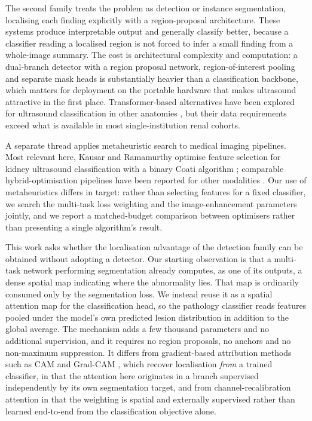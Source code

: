 \documentclass[pdflatex,sn-mathphys-num]{sn-jnl}
\theoremstyle{thmstyleone}%
\theoremstyle{thmstyletwo}%
\theoremstyle{thmstylethree}%
\begin{document}
The second family treats the problem as detection or instance segmentation, localising each
finding explicitly with a region-proposal architecture. These systems produce interpretable
output and generally classify better, because a classifier reading a localised region is not
forced to infer a small finding from a whole-image summary. The cost is architectural complexity
and computation: a dual-branch detector with a region proposal network, region-of-interest
pooling and separate mask heads is substantially heavier than a classification backbone, which
matters for deployment on the portable hardware that makes ultrasound attractive in the first
place. Transformer-based alternatives have been explored for ultrasound classification in other
anatomies \cite{bib_fetalvit}, but their data requirements exceed what is available in most
single-institution renal cohorts.

A separate thread applies metaheuristic search to medical imaging pipelines. Most relevant here,
Kausar and Ramamurthy optimise feature selection for kidney ultrasound classification with a
binary Coati algorithm \cite{bib_coatikidney}; comparable hybrid-optimisation pipelines have been
reported for other modalities \cite{bib_dentalopt}. Our use of metaheuristics differs in target:
rather than selecting features for a fixed classifier, we search the multi-task loss weighting
and the image-enhancement parameters jointly, and we report a matched-budget comparison between
optimisers rather than presenting a single algorithm's result.

This work asks whether the localisation advantage of the detection family can be obtained
without adopting a detector. Our starting observation is that a multi-task network performing
segmentation already computes, as one of its outputs, a dense spatial map indicating where the
abnormality lies. That map is ordinarily consumed only by the segmentation loss. We instead reuse
it as a spatial attention map for the classification head, so the pathology classifier reads
features pooled under the model's own predicted lesion distribution in addition to the global
average. The mechanism adds a few thousand parameters and no additional supervision, and it
requires no region proposals, no anchors and no non-maximum suppression. It differs from
gradient-based attribution methods such as CAM and Grad-CAM \cite{bib_cam,bib_gradcam}, which
recover localisation \emph{from} a trained classifier, in that the attention here originates in a
branch supervised independently by its own segmentation target, and from channel-recalibration
attention \cite{bib_senet} in that the weighting is spatial and externally supervised rather than
learned end-to-end from the classification objective alone.
\end{document}

